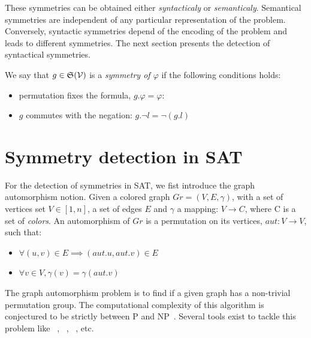 These symmetries can be obtained either \textit{syntacticaly} or \textit{semanticaly}.
Semantical symmetries are independent of any particular representation of the problem. Conversely,
syntactic symmetries depend of the encoding of the problem and leads to different symmetries.
The next section presents the detection of syntactical symmetries.

 We say that $g\in \mathfrak{S}(\mathcal{V})$ is a \textit{symmetry of $ \varphi$} if the following conditions holds:
\begin{itemize}[topsep=0em]
	\item permutation fixes the formula, $g.\varphi =  \varphi$: 
	\item $g$  commutes with the negation: $g.\neg l  = \neg (g.l)$
\end{itemize}

\section{Symmetry detection in SAT}
For the detection of symmetries in SAT, we fist introduce the graph automorphism notion.
Given a colored graph $Gr = (V, E, \gamma)$, with a set of vertices set $V \in  [1, n] $, a set of edges $E$ and
$\gamma$ a mapping: $V \rightarrow C$, where C is a set of \emph{colors}.
An automorphism of $Gr$ is a permutation on its vertices, $aut :V \rightarrow V$,
such that:
\begin{itemize}
 \item $\forall (u, v) \in E \implies (aut.u, aut.v) \in E$
 \item $\forall v \in V, \gamma(v) = \gamma(aut.v)$
\end{itemize}
The graph automorphism problem is to find if a given graph has a non-trivial permutation group. 
The computational complexity of this algorithm is conjectured to be strictly between P and NP~\cite{kobler2012graph,toran2004hardness}.
Several tools exist to tackle this problem like \saucy~\cite{katebi2010symmetry},
\bliss~\cite{JunttilaKaski:ALENEX2007}, \nauty~\cite{mckay2003nauty}, etc.

%

